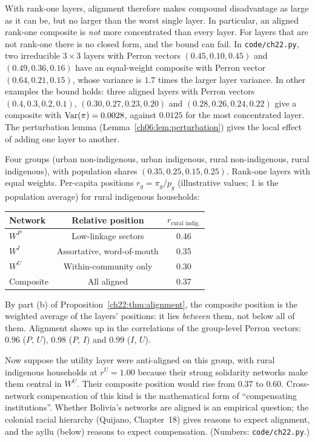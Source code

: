 \documentclass[../structural_economics_book.tex]{subfiles}
\begin{document}
With rank-one layers, alignment therefore makes compound disadvantage as large as it can be, but no larger than the worst single layer. In particular, an aligned rank-one composite is \emph{not} more concentrated than every layer. For layers that are not rank-one there is no closed form, and the bound can fail. In \texttt{code/ch22.py}, two irreducible $3 \times 3$ layers with Perron vectors $(0.45, 0.10, 0.45)$ and $(0.49, 0.36, 0.16)$ have an equal-weight composite with Perron vector $(0.64, 0.21, 0.15)$, whose variance is $1.7$ times the larger layer variance. In other examples the bound holds: three aligned layers with Perron vectors $(0.4, 0.3, 0.2, 0.1)$, $(0.30, 0.27, 0.23, 0.20)$ and $(0.28, 0.26, 0.24, 0.22)$ give a composite with $\operatorname{Var}(\pi) = 0.0028$, against $0.0125$ for the most concentrated layer. The perturbation lemma (Lemma~\ref{ch06:lem:perturbation}) gives the local effect of adding one layer to another.

\begin{example}\label{ch22:ex:alignment}
Four groups (urban non-indigenous, urban indigenous, rural non-indigenous, rural indigenous), with population shares $(0.35, 0.25, 0.15, 0.25)$. Rank-one layers with equal weights. Per-capita positions $r_g = \pi_g/p_g$ (illustrative values; 1 is the population average) for rural indigenous households:

\begin{center}
\begin{tabular}{lcc}
\toprule
Network & Relative position & $r_{\text{rural indig.}}$ \\
\midrule
$W^P$ & Low-linkage sectors & 0.46 \\
$W^I$ & Assortative, word-of-mouth & 0.35 \\
$W^U$ & Within-community only & 0.30 \\
\midrule
Composite & All aligned & 0.37 \\
\bottomrule
\end{tabular}
\end{center}

By part (b) of Proposition~\ref{ch22:thm:alignment}, the composite position is the weighted average of the layers' positions: it lies \emph{between} them, not below all of them. Alignment shows up in the correlations of the group-level Perron vectors: $0.96$ ($P$, $U$), $0.98$ ($P$, $I$) and $0.99$ ($I$, $U$).

Now suppose the utility layer were anti-aligned on this group, with rural indigenous households at $r^U = 1.00$ because their strong solidarity networks make them central in $W^U$. Their composite position would rise from $0.37$ to $0.60$. Cross-network compensation of this kind is the mathematical form of ``compensating institutions''. Whether Bolivia's networks are aligned is an empirical question; the colonial racial hierarchy (Quijano, Chapter~18) gives reasons to expect alignment, and the ayllu (below) reasons to expect compensation. (Numbers: \texttt{code/ch22.py}.)
\end{example}
\end{document}
